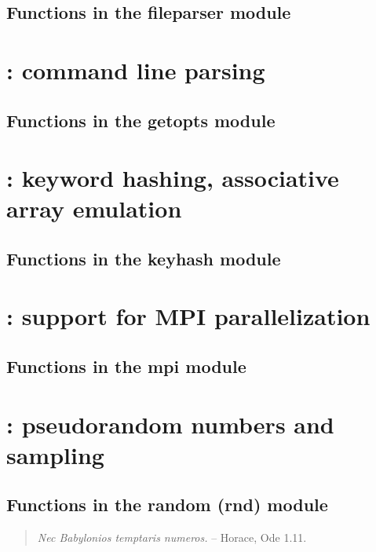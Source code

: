 \documentclass[10pt]{book}
\begin{document}
\subsection{Functions in the fileparser module}


\newpage
\section{: command line parsing}

\subsection{Functions in the getopts module}


\newpage
\section{: keyword hashing, associative array emulation}

\subsection{Functions in the keyhash module}


\newpage
\section{: support for MPI parallelization}

\subsection{Functions in the mpi module}

\vspace*{\fill}

\newpage
\section{: pseudorandom numbers and sampling}

\subsection{Functions in the random (rnd) module}

\vspace*{\fill}

\begin{quote}
\emph{Nec Babylonios temptaris numeros.} \hspace{3em} -- Horace, Ode
1.11. \\ 
\end{quote}     
\end{document}
